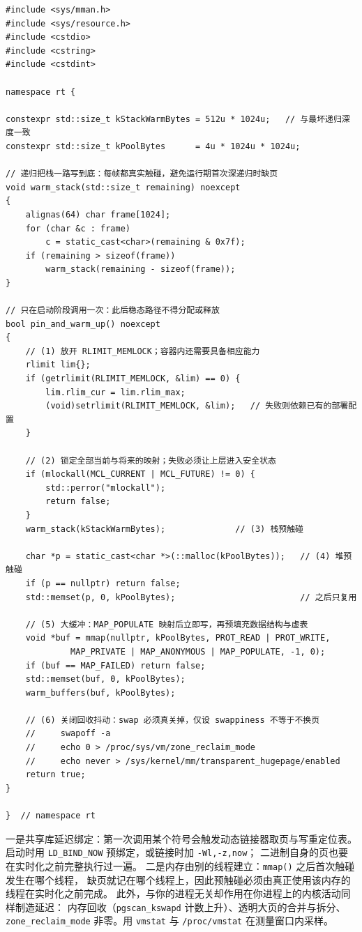 \documentclass[12pt,a4paper,fontset=fandol]{ctexbook}
\newcommand{\Fn}[1]{\texttt{#1()}}
\newcommand{\Tp}[1]{\texttt{#1}}
\begin{document}
\begin{lstlisting}[style=cppstyle,caption={C++：mlockall 与栈、堆的预触碰},label={lst:ch08-mlock}]
#include <sys/mman.h>
#include <sys/resource.h>
#include <cstdio>
#include <cstring>
#include <cstdint>

namespace rt {

constexpr std::size_t kStackWarmBytes = 512u * 1024u;   // 与最坏递归深度一致
constexpr std::size_t kPoolBytes      = 4u * 1024u * 1024u;

// 递归把栈一路写到底：每帧都真实触碰，避免运行期首次深递归时缺页
void warm_stack(std::size_t remaining) noexcept
{
	alignas(64) char frame[1024];
	for (char &c : frame)
		c = static_cast<char>(remaining & 0x7f);
	if (remaining > sizeof(frame))
		warm_stack(remaining - sizeof(frame));
}

// 只在启动阶段调用一次：此后稳态路径不得分配或释放
bool pin_and_warm_up() noexcept
{
	// (1) 放开 RLIMIT_MEMLOCK；容器内还需要具备相应能力
	rlimit lim{};
	if (getrlimit(RLIMIT_MEMLOCK, &lim) == 0) {
		lim.rlim_cur = lim.rlim_max;
		(void)setrlimit(RLIMIT_MEMLOCK, &lim);   // 失败则依赖已有的部署配置
	}

	// (2) 锁定全部当前与将来的映射；失败必须让上层进入安全状态
	if (mlockall(MCL_CURRENT | MCL_FUTURE) != 0) {
		std::perror("mlockall");
		return false;
	}
	warm_stack(kStackWarmBytes);              // (3) 栈预触碰

	char *p = static_cast<char *>(::malloc(kPoolBytes));   // (4) 堆预触碰
	if (p == nullptr) return false;
	std::memset(p, 0, kPoolBytes);                         // 之后只复用

	// (5) 大缓冲：MAP_POPULATE 映射后立即写，再预填充数据结构与虚表
	void *buf = mmap(nullptr, kPoolBytes, PROT_READ | PROT_WRITE,
			 MAP_PRIVATE | MAP_ANONYMOUS | MAP_POPULATE, -1, 0);
	if (buf == MAP_FAILED) return false;
	std::memset(buf, 0, kPoolBytes);
	warm_buffers(buf, kPoolBytes);

	// (6) 关闭回收抖动：swap 必须真关掉，仅设 swappiness 不等于不换页
	//     swapoff -a
	//     echo 0 > /proc/sys/vm/zone_reclaim_mode
	//     echo never > /sys/kernel/mm/transparent_hugepage/enabled
	return true;
}

}  // namespace rt
\end{lstlisting}

\begin{warning}[title={锁定之后仍然缺页的两个隐蔽入口}]
一是共享库延迟绑定：第一次调用某个符号会触发动态链接器取页与写重定位表。
启动时用 \Tp{LD\_BIND\_NOW} 预绑定，或链接时加 \Tp{-Wl,-z,now}；
二进制自身的页也要在实时化之前完整执行过一遍。
二是内存由别的线程建立：\Fn{mmap} 之后首次触碰发生在哪个线程，
缺页就记在哪个线程上，因此预触碰必须由真正使用该内存的线程在实时化之前完成。
此外，与你的进程无关却作用在你进程上的内核活动同样制造延迟：
内存回收（\Tp{pgscan\_kswapd} 计数上升）、透明大页的合并与拆分、
\Tp{zone\_reclaim\_mode} 非零。用 \Tp{vmstat} 与 \Tp{/proc/vmstat} 在测量窗口内采样。
\end{warning}
\end{document}
